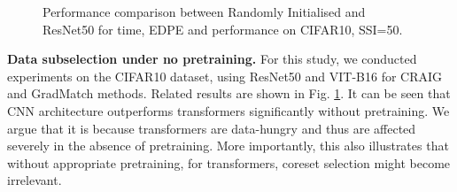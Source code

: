 \begin{figure}
\vspace{-1em}
\caption{Performance comparison between Randomly Initialised \vit and ResNet50 for time, EDPE and performance on CIFAR10, SSI=50.}
\label{fig:rand-train}
\end{figure} 
\textbf{Data subselection under no pretraining. } 
For this study, we conducted experiments on the CIFAR10 dataset, using ResNet50 and VIT-B16 for CRAIG and GradMatch methods. Related results are shown in Fig. \ref{fig:rand-train}. It can be seen that CNN architecture outperforms transformers significantly without pretraining. We argue that it is because transformers are data-hungry and thus are affected severely in the absence of pretraining. More importantly, this also illustrates that without appropriate pretraining, for transformers, coreset selection might become irrelevant. 











